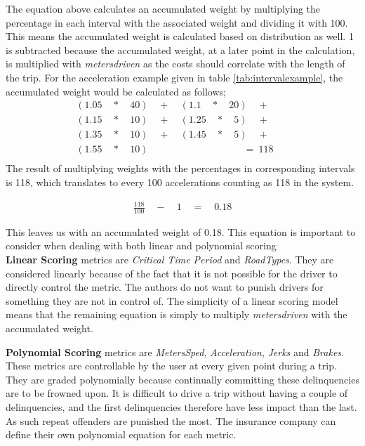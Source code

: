 The equation above calculates an accumulated weight by multiplying the percentage in each interval with the associated weight and dividing it with 100. This means the accumulated weight is calculated based on distribution as well. 1 is subtracted because the accumulated weight, at a later point in the calculation, is multiplied with \textit{metersdriven} as the costs should correlate with the length of the trip. For the acceleration example given in table \ref{tab:intervalexample}, the accumulated weight would be calculated as follows;
\begin{align*}
(1.05\quad *\quad 40)\quad +\quad (1.1\quad *\quad 20)\quad +\quad \quad \\ 
  (1.15\quad *\quad 10)\quad +\quad (1.25\quad *\quad 5)\quad +\quad \quad \\
  (1.35\quad *\quad 10)\quad +\quad (1.45\quad *\quad 5)\quad +\quad \quad \\
  (1.55\quad *\quad 10)\quad \quad \quad \quad \quad \quad \quad \quad \ \ \ \quad =\ 118 \\
\end{align*}
The result of multiplying weights with the percentages in corresponding intervals is 118, which translates to every 100 accelerations counting as 118 in the system.

\begin{align*}
\frac { 118 }{ 100 } \quad -\quad 1\quad =\quad 0.18
\end{align*}


This leaves us with an accumulated weight of 0.18. This equation is important to consider when dealing with both linear and polynomial scoring\\

\textbf{Linear Scoring} metrics are \textit{Critical Time Period} and \textit{RoadTypes}. They are considered linearly because of the fact that it is not possible for the driver to directly control the metric. The authors do not want to punish drivers for something they are not in control of. 
The simplicity of a linear scoring model means that the remaining equation is simply to multiply \textit{metersdriven} with the accumulated weight.

\textbf{Polynomial Scoring} metrics are \textit{MetersSped}, \textit{Acceleration}, \textit{Jerks} and \textit{Brakes}. These metrics are controllable by the user at every given point during a trip. They are graded polynomially because continually committing these delinquencies are to be frowned upon. It is difficult to drive a trip without having a couple of delinquencies, and the first delinquencies therefore have less impact than the last. As such repeat offenders are punished the most. The insurance company can define their own polynomial equation for each metric.

